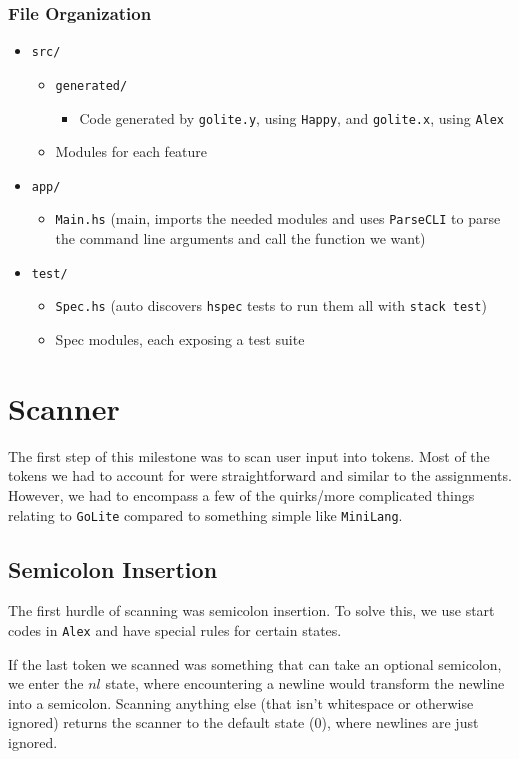 \documentclass[11pt]{article}
\begin{document}
\subsubsection{File Organization}
\label{sec:org1ddc6fd}
\begin{itemize}
\item \texttt{src/}
\begin{itemize}
\item \texttt{generated/}
\begin{itemize}
\item Code generated by \texttt{golite.y}, using \texttt{Happy}, and \texttt{golite.x}, using \texttt{Alex}
\end{itemize}
\item Modules for each feature
\end{itemize}
\item \texttt{app/}
\begin{itemize}
\item \texttt{Main.hs} (main, imports the needed modules and uses
\texttt{ParseCLI} to parse the command line arguments and call the
function we want)
\end{itemize}
\item \texttt{test/}
\begin{itemize}
\item \texttt{Spec.hs} (auto discovers \texttt{hspec} tests to run them all with
\texttt{stack test})
\item Spec modules, each exposing a test suite
\end{itemize}
\end{itemize}
\section{Scanner}
\label{sec:orgdb98011}
The first step of this milestone was to scan user input into
tokens. Most of the tokens we had to account for were straightforward
and similar to the assignments. However, we had to encompass a few of
the quirks/more complicated things relating to \texttt{GoLite} compared to
something simple like \texttt{MiniLang}.
\subsection{Semicolon Insertion}
\label{sec:orgf48ff83}
The first hurdle of scanning was semicolon insertion. To solve
this, we use start codes in \texttt{Alex} and have special rules for
certain states.

If the last token we scanned was something
that can take an optional semicolon, we enter the \(nl\) state, where
encountering a newline would transform the newline into a
semicolon. Scanning anything else (that isn't whitespace or otherwise
ignored) returns the scanner to the default state (\(0\)), where
newlines are just ignored.
\end{document}
